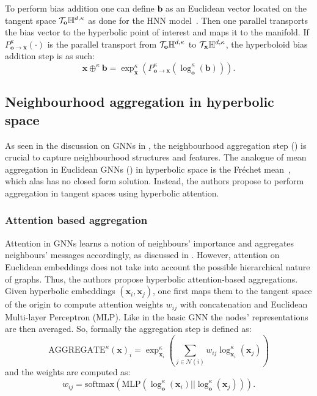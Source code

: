 To perform bias addition one can define $\mathbf{b}$ as an Euclidean vector located on the tangent space $\mathcal{T}_\mathbf{o}\mathbb{H}^{d,\kappa}$ as done for the HNN model~\cite{ganea2018HNN}. Then one parallel transports the bias vector to the hyperbolic point of interest and maps it to the manifold. If $P_{\mathbf{o}\to \mathbf{x}}^\kappa (\cdot)$ is the parallel transport from $\mathcal{T}_\mathbf{o}\mathbb{H}^{d,\kappa}$ to $\mathcal{T}_{\mathbf{x}}\mathbb{H}^{d,\kappa}$, the hyperboloid bias addition step is as such:
\begin{equation*}
    \mathbf{x} \oplus^\kappa \mathbf{b} = \exp_{\mathbf{x}}^\kappa\left(P_{\mathbf{o}\to \mathbf{x}}^\kappa\left(\log_{\mathbf{o}}^\kappa(\mathbf{b})\right)\right).
\end{equation*}

\subsection{Neighbourhood aggregation in hyperbolic space}
As seen in the discussion on GNNs in , the neighbourhood aggregation step () is crucial to capture neighbourhood structures and features. The analogue of mean aggregation in Euclidean GNNs () in hyperbolic space is the Fréchet mean~\cite{frechet1948elements}, which alas has no closed form solution. Instead, the authors propose to perform aggregation in tangent spaces using hyperbolic attention.

\subsubsection{Attention based aggregation}
Attention in GNNs learns a notion of neighbours' importance and aggregates neighbours' messages accordingly, as discussed in . However, attention on Euclidean embeddings does not take into account the possible hierarchical nature of graphs. Thus, the authors propose hyperbolic attention-based aggregations. Given hyperbolic embeddings $(\mathbf{x}_i, \mathbf{x}_j)$, one first maps them to the tangent space of the origin to compute attention weights $w_{ij}$ with concatenation and Euclidean Multi-layer Perceptron (MLP). Like in the basic GNN the nodes' representations are then averaged. So, formally the aggregation step is defined as:
\begin{equation*}
    \text{AGGREGATE}^\kappa(\mathbf{x})_i = \exp_{\mathbf{x}_i}^\kappa\left(\sum_{j\in\mathcal{N}(i)}w_{ij}\log_{\mathbf{x}_i}^\kappa\left(\mathbf{x}_j\right)\right)
\end{equation*}
and the weights are computed as:
\begin{equation*}
    w_{ij} = \text{softmax}\left(\text{MLP}\left(\log_{\mathbf{o}}^\kappa(\mathbf{x}_i) \left|\right| \log_{\mathbf{o}}^\kappa\left(\mathbf{x}_j\right)\right)\right).
\end{equation*}

